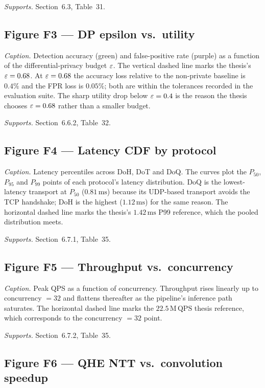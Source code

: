 \emph{Supports.} Section~6.3, Table~31.

\subsection*{Figure F3 --- DP epsilon vs.\ utility}

\emph{Caption.} Detection accuracy (green) and false-positive rate
(purple) as a function of the differential-privacy budget $\varepsilon$. The
vertical dashed line marks the thesis's $\varepsilon = 0.68$. At
$\varepsilon = 0.68$ the accuracy loss relative to the non-private baseline
is $0.4\%$ and the FPR loss is $0.05\%$; both are within the
tolerances recorded in the evaluation suite. The sharp utility drop
below $\varepsilon = 0.4$ is the reason the thesis chooses $\varepsilon = 0.68$
rather than a smaller budget.

\emph{Supports.} Section~6.6.2, Table~32.

\subsection*{Figure F4 --- Latency CDF by protocol}

\emph{Caption.} Latency percentiles across DoH, DoT and DoQ. The
curves plot the $P_{50}$, $P_{95}$ and $P_{99}$ points of each
protocol's latency distribution. DoQ is the lowest-latency transport
at $P_{50}$ ($0.81\,\mathrm{ms}$) because its UDP-based transport
avoids the TCP handshake; DoH is the highest ($1.12\,\mathrm{ms}$) for
the same reason. The horizontal dashed line marks the thesis's
$1.42\,\mathrm{ms}$ P99 reference, which the pooled distribution
meets.

\emph{Supports.} Section~6.7.1, Table~35.

\subsection*{Figure F5 --- Throughput vs.\ concurrency}

\emph{Caption.} Peak QPS as a function of concurrency. Throughput
rises linearly up to concurrency $= 32$ and flattens thereafter as the
pipeline's inference path saturates. The horizontal dashed line
marks the $22.5\,\mathrm{M}\,\mathrm{QPS}$ thesis reference, which
corresponds to the concurrency $= 32$ point.

\emph{Supports.} Section~6.7.2, Table~35.

\subsection*{Figure F6 --- QHE NTT vs.\ convolution speedup}

